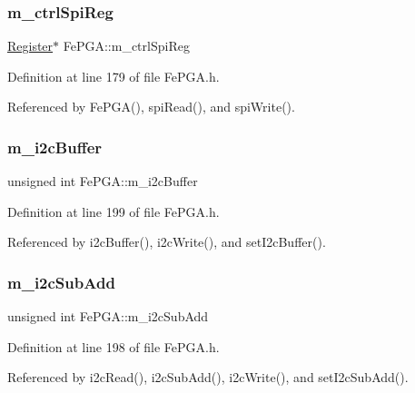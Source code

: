 \subsubsection{\texorpdfstring{m\+\_\+ctrl\+Spi\+Reg}{m\_ctrlSpiReg}}
{\footnotesize\ttfamily \hyperlink{classRegister}{Register}$\ast$ Fe\+P\+G\+A\+::m\+\_\+ctrl\+Spi\+Reg\hspace{0.3cm}{\ttfamily [private]}}



Definition at line 179 of file Fe\+P\+G\+A.\+h.



Referenced by Fe\+P\+G\+A(), spi\+Read(), and spi\+Write().

\mbox{\label{classFePGA_a173664ffd6a73f454ae31f51e689dd16}} 
\subsubsection{\texorpdfstring{m\+\_\+i2c\+Buffer}{m\_i2cBuffer}}
{\footnotesize\ttfamily unsigned int Fe\+P\+G\+A\+::m\+\_\+i2c\+Buffer\hspace{0.3cm}{\ttfamily [private]}}



Definition at line 199 of file Fe\+P\+G\+A.\+h.



Referenced by i2c\+Buffer(), i2c\+Write(), and set\+I2c\+Buffer().

\mbox{\label{classFePGA_aba8c2c8d8e0d136826b9dd4c2d7c2e90}} 
\subsubsection{\texorpdfstring{m\+\_\+i2c\+Sub\+Add}{m\_i2cSubAdd}}
{\footnotesize\ttfamily unsigned int Fe\+P\+G\+A\+::m\+\_\+i2c\+Sub\+Add\hspace{0.3cm}{\ttfamily [private]}}



Definition at line 198 of file Fe\+P\+G\+A.\+h.



Referenced by i2c\+Read(), i2c\+Sub\+Add(), i2c\+Write(), and set\+I2c\+Sub\+Add().

